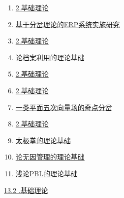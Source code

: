 \documentclass{article}
\begin{document}
\begin{enumerate}
\def\labelenumi{\arabic{enumi}.}
\setcounter{enumi}{1}
\item
  \href{https://www.ixueshu.com/api/search/info/16c147a8ae4f4038a7b5481c9869a2e9318947a18e7f9386.html?from=pdf}{{2.基础理论}}
\item
  \href{https://www.ixueshu.com/api/search/info/b182fab31af30eb17f8df8c9bbd94686318947a18e7f9386.html?from=pdf}{{基于分岔理论的ERP系统实施研究}}
\item
  \href{https://www.ixueshu.com/api/search/info/4e0dce557d53fd6c62e6d7200d0a1b1b318947a18e7f9386.html?from=pdf}{{2.基础理论}}
\item
  \href{https://www.ixueshu.com/api/search/info/9e34d7aacc0ae6f1bdcd58f11f2323ed318947a18e7f9386.html?from=pdf}{{论档案利用的理论基础}}
\item
  \href{https://www.ixueshu.com/api/search/info/4e0dce557d53fd6c92ad11030a046b8e318947a18e7f9386.html?from=pdf}{{2.基础理论}}
\item
  \href{https://www.ixueshu.com/api/search/info/c52eb7b044f9bfffebc5f9849106cd8c318947a18e7f9386.html?from=pdf}{{2.基础理论}}
\item
  \href{https://www.ixueshu.com/api/search/info/cbdda1caac6215c2ac042a3a6ba190b8318947a18e7f9386.html?from=pdf}{{一类平面五次向量场的奇点分岔}}
\item
  \href{https://www.ixueshu.com/api/search/info/16c147a8ae4f403810e5176e67e23e41318947a18e7f9386.html?from=pdf}{{2.基础理论}}
\item
  \href{https://www.ixueshu.com/api/search/info/3310b82f4f180d58a9f4f7a2f01bcb7a318947a18e7f9386.html?from=pdf}{{太极拳的理论基础}}
\item
  \href{https://www.ixueshu.com/api/search/info/850e6dc2463dc579569d00af3647e668318947a18e7f9386.html?from=pdf}{{论无因管理的理论基础}}
\item
  \href{https://www.ixueshu.com/api/search/info/886e55bb4cce3afe356fb1aa078fbb30318947a18e7f9386.html?from=pdf}{{浅论PBL的理论基础}}
\end{enumerate}

\href{https://www.ixueshu.com/api/search/info/e27ba01d21ad780feb915770f9e138c2318947a18e7f9386.html?from=pdf}{{13.2
.基础理论}}
\end{document}
